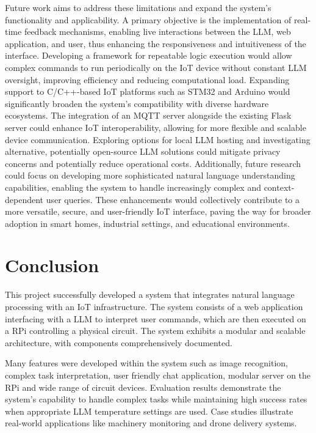 \documentclass{ieeeaccess}
\begin{document}
Future work aims to address these limitations and expand the system's functionality and applicability. A primary objective is the implementation of real-time feedback mechanisms, enabling live interactions between the LLM, web application, and user, thus enhancing the responsiveness and intuitiveness of the interface. Developing a framework for repeatable logic execution would allow complex commands to run periodically on the IoT device without constant LLM oversight, improving efficiency and reducing computational load. Expanding support to C/C++-based IoT platforms such as STM32 and Arduino would significantly broaden the system's compatibility with diverse hardware ecosystems. The integration of an MQTT server alongside the existing Flask server could enhance IoT interoperability, allowing for more flexible and scalable device communication. Exploring options for local LLM hosting and investigating alternative, potentially open-source LLM solutions could mitigate privacy concerns and potentially reduce operational costs. Additionally, future research could focus on developing more sophisticated natural language understanding capabilities, enabling the system to handle increasingly complex and context-dependent user queries. These enhancements would collectively contribute to a more versatile, secure, and user-friendly IoT interface, paving the way for broader adoption in smart homes, industrial settings, and educational environments.

\section{Conclusion}\label{sec:conclusion}
This project successfully developed a system that integrates natural language processing with an IoT infrastructure. The system consists of a web application interfacing with a LLM to interpret user commands, which are then executed on a RPi controlling a physical circuit. The system exhibits a modular and scalable architecture, with components comprehensively documented. 

Many features were developed within the system such as image recognition, complex task interpretation, user friendly chat application, modular server on the RPi and wide range of circuit devices. Evaluation results demonstrate the system's capability to handle complex tasks while maintaining high success rates when appropriate LLM temperature settings are used. Case studies illustrate real-world applications like machinery monitoring and drone delivery systems.
\end{document}
